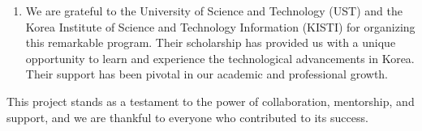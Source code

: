 \documentclass[conference]{IEEEtran}
\begin{document}
\begin{enumerate}
    \item We are grateful to the University of Science and Technology (UST) and the Korea Institute of Science and Technology Information (KISTI) for organizing this remarkable program. Their scholarship has provided us with a unique opportunity to learn and experience the technological advancements in Korea. Their support has been pivotal in our academic and professional growth.
\end{enumerate}

This project stands as a testament to the power of collaboration, mentorship, and support, and we are thankful to everyone who contributed to its success.



\end{document}
